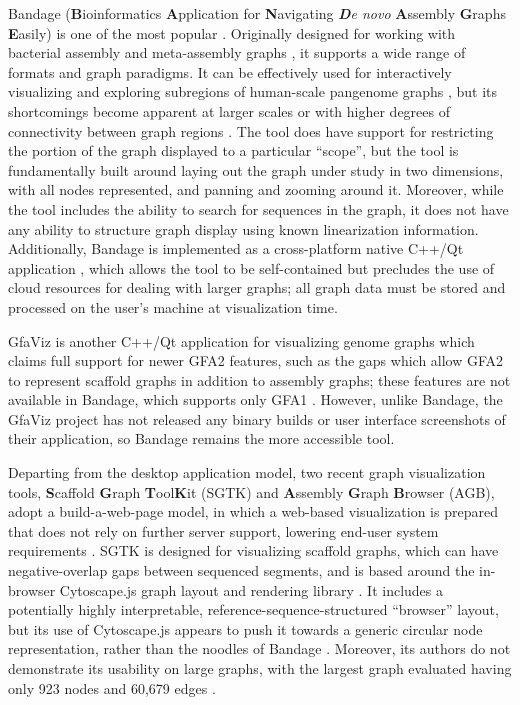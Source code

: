 Bandage (\textbf{B}ioinformatics \textbf{A}pplication for \textbf{N}avigating \textit{\textbf{D}e novo} \textbf{A}ssembly \textbf{G}raphs \textbf{E}asily) \citep{Wick_2015} is one of the most popular \citep{Mikheenko_2019}.
Originally designed for working with bacterial assembly and meta-assembly graphs \citep{Wick_2015}, it supports a wide range of formats and graph  paradigms.
It can be effectively used for interactively visualizing and exploring subregions of human-scale pangenome graphs \citep{Garrison_2019}, but its shortcomings become apparent at larger scales or with higher degrees of connectivity between graph regions \citep{Mikheenko_2019}.
The tool does have support for restricting the portion of the graph displayed to a particular ``scope'', but the tool is fundamentally built around laying out the graph under study in two dimensions, with all nodes represented, and panning and zooming around it.
Moreover, while the tool includes the ability to search for sequences in the graph, it does not have any ability to structure graph display using known linearization information.
Additionally, Bandage is implemented as a cross-platform native C++/Qt application \citep{Wick_2015}, which allows the tool to be self-contained but precludes the use of cloud resources for dealing with larger graphs; all graph data must be stored and processed on the user's machine at visualization time.

GfaViz is another C++/Qt application for visualizing genome graphs which claims full support for newer GFA2 features, such as the gaps which allow GFA2 to represent scaffold graphs in addition to assembly graphs; these features are not available in Bandage, which supports only GFA1 \citep{Gonnella_2018}.
However, unlike Bandage, the GfaViz project has not released any binary builds or user interface screenshots of their application, so Bandage remains the more accessible tool.

Departing from the desktop application model, two recent graph visualization tools, \textbf{S}caffold \textbf{G}raph \textbf{T}ool\textbf{K}it (SGTK) and \textbf{A}ssembly \textbf{G}raph \textbf{B}rowser (AGB), adopt a build-a-web-page model, in which a web-based visualization is prepared that does not rely on further server support, lowering end-user system requirements \citep{Kunyavskaya_2018,Mikheenko_2019}.
SGTK is designed for visualizing scaffold graphs, which can have negative-overlap gaps between sequenced segments, and is based around the in-browser Cytoscape.js graph layout and rendering library \citep{Kunyavskaya_2018}.
It includes a potentially highly interpretable, reference-sequence-structured ``browser'' layout, but its use of Cytoscape.js appears to push it towards a generic circular node representation, rather than the noodles of Bandage \citep{Kunyavskaya_2018}.
Moreover, its authors do not demonstrate its usability on large graphs, with the largest graph evaluated having only 923 nodes and 60,679 edges \citep{Kunyavskaya_2018}.

